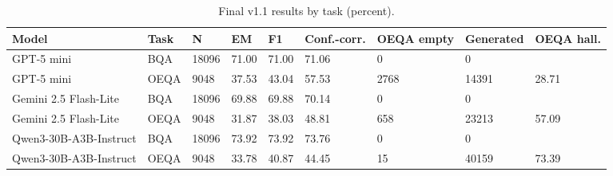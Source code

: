 \begin{table}[t]
\centering
\small
\begin{tabular}{lllllllll}
\toprule
Model & Task & N & EM & F1 & Conf.-corr. & OEQA empty & Generated & OEQA hall. \\
\midrule
GPT-5 mini & BQA & 18096 & 71.00 & 71.00 & 71.06 & 0 & 0 &  \\
GPT-5 mini & OEQA & 9048 & 37.53 & 43.04 & 57.53 & 2768 & 14391 & 28.71 \\
Gemini 2.5 Flash-Lite & BQA & 18096 & 69.88 & 69.88 & 70.14 & 0 & 0 &  \\
Gemini 2.5 Flash-Lite & OEQA & 9048 & 31.87 & 38.03 & 48.81 & 658 & 23213 & 57.09 \\
Qwen3-30B-A3B-Instruct & BQA & 18096 & 73.92 & 73.92 & 73.76 & 0 & 0 &  \\
Qwen3-30B-A3B-Instruct & OEQA & 9048 & 33.78 & 40.87 & 44.45 & 15 & 40159 & 73.39 \\
\bottomrule
\end{tabular}
\caption{Final v1.1 results by task (percent).}
\label{tab:core-v11-task}
\end{table}
